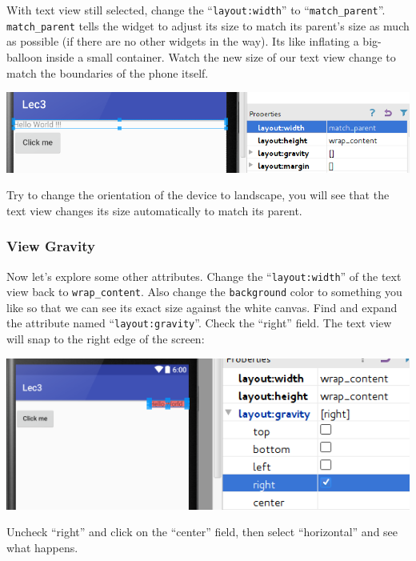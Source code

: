 With text view still selected, change the ``\texttt{layout:width}'' to ``\texttt{match\_parent}''. \texttt{match\_parent} tells the widget to adjust its size to match its parent's size as much as possible (if there are no other widgets in the way). Its like inflating a big-balloon inside a small container. Watch the new size of our text view change to match the boundaries of the phone itself.

\begin{center}
	\includegraphics[scale=0.4]{chapters/ch03/images/10_layout_width}
\end{center} 

Try to change the orientation of the device to landscape, you will see that the text view changes its size automatically to match its parent. 

\subsubsection{View Gravity}

Now let's explore some other attributes. Change the ``\texttt{layout:width}'' of the text view back to \texttt{wrap\_content}. Also change the \texttt{background} color to something you like so that we can see its exact size against the white canvas. Find and expand the attribute named ``\texttt{layout:gravity}''. Check the ``right'' field. The text view will snap to the right edge of the screen:

\begin{center}
	\includegraphics[scale=0.4]{chapters/ch03/images/11_layout_gravity}
\end{center} 

Uncheck ``right'' and click on the ``center'' field, then select ``horizontal'' and see what happens. \\

